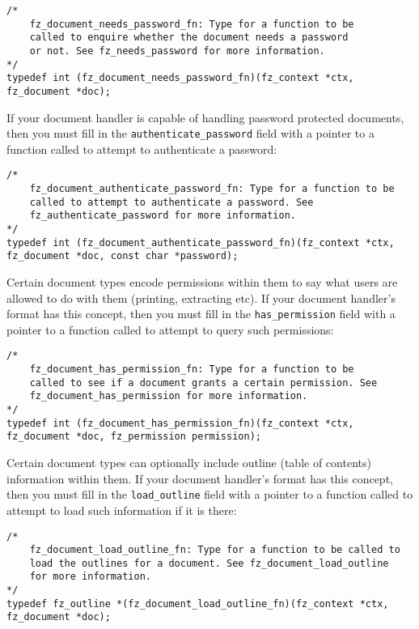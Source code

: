 \documentclass[oneside]{book}
\begin{document}
\begin{lstlisting}
/*
	fz_document_needs_password_fn: Type for a function to be
	called to enquire whether the document needs a password
	or not. See fz_needs_password for more information.
*/
typedef int (fz_document_needs_password_fn)(fz_context *ctx, fz_document *doc);
\end{lstlisting}

If your document handler is capable of handling password protected documents, then you must fill in the \texttt{authenticate\_password} field with a pointer to a function called to attempt to authenticate a password:

\begin{lstlisting}
/*
	fz_document_authenticate_password_fn: Type for a function to be
	called to attempt to authenticate a password. See
	fz_authenticate_password for more information.
*/
typedef int (fz_document_authenticate_password_fn)(fz_context *ctx, fz_document *doc, const char *password);
\end{lstlisting}

Certain document types encode permissions within them to say what users are allowed to do with them (printing, extracting etc). If your document handler's format has this concept, then you must fill in the \texttt{has\_permission} field with a pointer to a function called to attempt to query such permissions:

\begin{lstlisting}
/*
	fz_document_has_permission_fn: Type for a function to be
	called to see if a document grants a certain permission. See
	fz_document_has_permission for more information.
*/
typedef int (fz_document_has_permission_fn)(fz_context *ctx, fz_document *doc, fz_permission permission);
\end{lstlisting}

Certain document types can optionally include outline (table of contents) information within them. If your document handler's format has this concept, then you must fill in the \texttt{load\_outline} field with a pointer to a function called to attempt to load such information if it is there:

\begin{lstlisting}
/*
	fz_document_load_outline_fn: Type for a function to be called to
	load the outlines for a document. See fz_document_load_outline
	for more information.
*/
typedef fz_outline *(fz_document_load_outline_fn)(fz_context *ctx, fz_document *doc);
\end{lstlisting}
\end{document}
